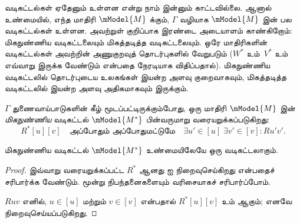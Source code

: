 \documentclass[../../../include/open-logic-section]{subfiles}
\begin{document}


வடிகட்டல்கள் ஏதேனும் உள்ளன என்று நாம் இன்னும் காட்டவில்லை. ஆனால் உண்மையில்,
எந்த மாதிரி $\mModel{M}$ க்கும், $\Gamma$ வழியாக $\mModel{M}$ இன் பல
வடிகட்டல்கள் உள்ளன. அவற்றுள் குறிப்பாக இரண்டை அடையாளம் காண்கிறோம்:
மிகநுண்ணிய வடிகட்டலையும் மிகத்தடித்த வடிகட்டலையும். ஒரே மாதிரிகளின்
வடிகட்டல்கள் அவற்றின் அணுகுறவுத் தொடர்புகளில் வேறுபடும்
($W^*$ உம்~$V^*$ உம் எவ்வாறு இருக்க வேண்டும் என்பதை
 நேரடியாக விதிப்பதால்). மிகநுண்ணிய
வடிகட்டலில் தொடர்புடைய உலகங்கள் இயன்ற அளவு குறைவாகவும், மிகத்தடித்த
வடிகட்டலில் இயன்ற அளவு அதிகமாகவும் இருக்கும்.

\begin{defn}
  $\Gamma$ துணைவாய்பாடுகளின் கீழ் மூடப்பட்டிருக்கும்போது, ஒரு
  மாதிரி $\mModel{M}$ இன் \emph{மிகநுண்ணிய} வடிகட்டல்
  $\mModel{M^*}$ பின்வருமாறு வரையறுக்கப்படுகிறது:
  \[
  R^*[u][v] \quad \text{அப்போதும் அப்போதுமட்டுமே} \quad \exists u'\in [u] \;
  \exists v' \in [v] : Ru'v'.
  \]
\end{defn}

\begin{prop}
  மிகநுண்ணிய வடிகட்டல் $\mModel{M^*}$ உண்மையிலேயே ஒரு வடிகட்டலாகும்.
\end{prop}

\begin{proof}
  இவ்வாறு வரையறுக்கப்பட்ட $R^*$ ஆனது
   ஐ
  நிறைவுசெய்கிறது என்பதைச் சரிபார்க்க வேண்டும். மூன்று நிபந்தனைகளையும்
  வரிசையாகச் சரிபார்ப்போம்.

  $Ruv$ எனில், $u \in [u]$ மற்றும் $v \in [v]$ என்பதால்
  $R^*[u][v]$ உம் ஆகும்; எனவே 
  நிறைவுசெய்யப்படுகிறது.


\end{proof}
\end{document}
